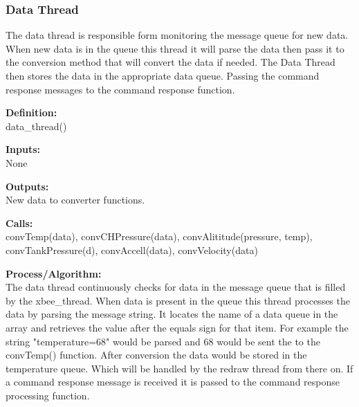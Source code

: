 \documentclass[10pt,draftclsnofoot,onecolumn,compsoc]{IEEEtran}
\begin{document}
\subsubsection{Data Thread}
The data thread is responsible form monitoring the message queue for new data. When new data is in the queue this thread it will parse the data  then pass it to the conversion method that will convert the data if needed. The Data Thread then stores the data in the appropriate data queue. Passing the command response messages to the command response function. \par
{\bf Definition:} \\ 
data\_thread() \par
{\bf Inputs:} \\  None \par
{\bf Outputs:} \\ New data to converter functions. \par
{\bf Calls:} \\ convTemp(data), convCHPressure(data), convAlititude(pressure, temp), convTankPressure(d), convAccell(data), convVelocity(data) \par
{\bf Process/Algorithm:} \\
The data thread continuously checks for data in the message queue that is filled by the xbee\_thread. When data is present in the queue this thread processes the data by parsing the message string. It locates the name of a data queue in the array and retrieves the value after the equals sign for that item. For example the string "temperature=68" would be parsed and 68 would be sent the to the convTemp() function. After conversion the data would be stored in the temperature queue. Which will be handled by the redraw thread from there on. If a command response message is received it is passed to the command response processing function.  \par
\end{document}
